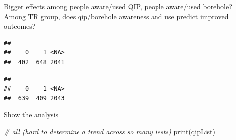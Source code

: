 \documentclass[
]{article}
\newenvironment{Shaded}{\begin{snugshade}}{\end{snugshade}}
\newcommand{\CommentTok}[1]{\textcolor[rgb]{0.56,0.35,0.01}{\textit{#1}}}
\newcommand{\FunctionTok}[1]{\textcolor[rgb]{0.00,0.00,0.00}{#1}}
\newcommand{\NormalTok}[1]{#1}
\begin{document}
Bigger effects among people aware/used QIP, people aware/used borehole?
Among TR group, does qip/borehole awareness and use predict improved
outcomes?

\begin{verbatim}
## 
##    0    1 <NA> 
##  402  648 2041
\end{verbatim}

\begin{verbatim}
## 
##    0    1 <NA> 
##  639  409 2043
\end{verbatim}

Show the analysis

\begin{Shaded}
\begin{Highlighting}[]
\CommentTok{\# all (hard to determine a trend across so many tests)}
\FunctionTok{print}\NormalTok{(qipList)}
\end{Highlighting}
\end{Shaded}
\end{document}
